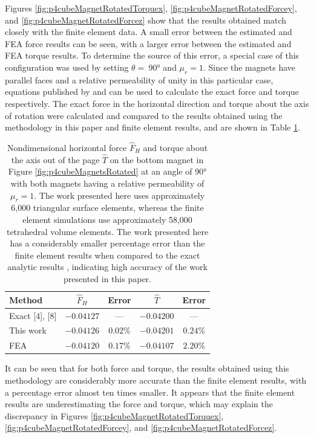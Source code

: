 Figures \ref{fig:p4cubeMagnetRotatedTorquex}, \ref{fig:p4cubeMagnetRotatedForcey}, and \ref{fig:p4cubeMagnetRotatedForcez} show that the results obtained match closely with the finite element data. A small error between the estimated and FEA force results can be seen, with a larger error between the estimated and FEA torque results. To determine the source of this error, a special case of this configuration was used by setting \(\theta =\ \)\ang{90} and \(\mu_r = 1\). Since the magnets have parallel faces and a relative permeability of unity in this particular case, equations published by \textcite{Akoun1984} and \textcite{Janssen2010} can be used to calculate the exact force and torque respectively. The exact force in the horizontal direction and torque about the axis of rotation were calculated and compared to the results obtained using the methodology in this paper and finite element results, and are shown in Table \ref{tab:p4analyticTorque}.
\begin{table}
    \centering
    \begin{tabular}{l|cc|cc}
    Method & $\hat F_H$ & Error & $\hat T$ & Error \\
    \hline
    Exact [4], [8] & $-0.04127$ & --- & $-0.04200$ & --- \\
    This work & $-0.04126$ & $0.02\%$ & $-0.04201$ & $0.24\%$ \\
    FEA & $-0.04120$ & $0.17\%$ & $-0.04107$ & $2.20\%$ \\
    \end{tabular}
    \caption{Nondimensional horizontal force \(\hat{F}_H\) and torque about the axis out of the page \(\hat{T}\) on the bottom magnet in Figure \ref{fig:p4cubeMagnetsRotated} at an angle of \ang{90} with both magnets having a relative permeability of \(\mu_r = 1\). The work presented here uses approximately 6,000 triangular surface elements, whereas the finite element simulations use approximately 58,000 tetrahedral volume elements. The work presented here has a considerably smaller percentage error than the finite element results when compared to the exact analytic results \cite{Akoun1984,Janssen2010}, indicating high accuracy of the work presented in this paper.}
    \label{tab:p4analyticTorque}
\end{table}
It can be seen that for both force and torque, the results obtained using this methodology are considerably more accurate than the finite element results, with a percentage error almost ten times smaller. It appears that the finite element results are underestimating the force and torque, which may explain the discrepancy in Figures \ref{fig:p4cubeMagnetRotatedTorquex}, \ref{fig:p4cubeMagnetRotatedForcey}, and \ref{fig:p4cubeMagnetRotatedForcez}.

